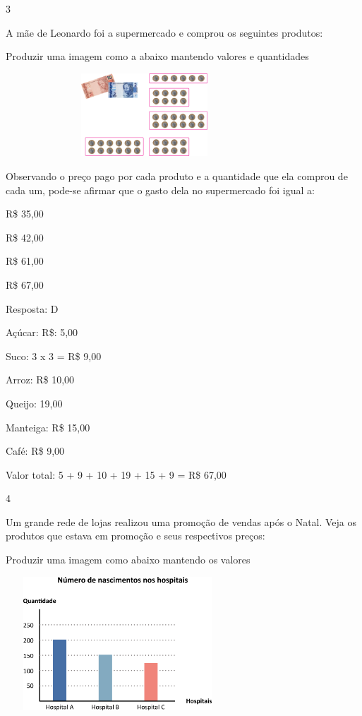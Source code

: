 \begin{escolha}
\num{3}

A mãe de Leonardo foi a supermercado e comprou os seguintes produtos:

Produzir uma imagem como a abaixo mantendo valores e quantidades

\includegraphics[width=4.10036in,height=1.22511in]{media/image74.png}

Observando o preço pago por cada produto e a quantidade que ela comprou
de cada um, pode-se afirmar que o gasto dela no supermercado foi igual
a:

\begin{escolha}

\item
  R\$ 35,00
\item
  R\$ 42,00
\item
  R\$ 61,00
\item
  R\$ 67,00
\end{escolha}

Resposta: D

Açúcar: R\$: 5,00

Suco: 3 x 3 = R\$ 9,00

Arroz: R\$ 10,00

Queijo: 19,00

Manteiga: R\$ 15,00

Café: R\$ 9,00

Valor total: 5 + 9 + 10 + 19 + 15 + 9 = R\$ 67,00

\num{4}

Um grande rede de lojas realizou uma promoção de vendas após o Natal.
Veja os produtos que estava em promoção e seus respectivos preços:

Produzir uma imagem como abaixo mantendo os valores

\includegraphics[width=3.30029in,height=1.97517in]{media/image75.png}


\end{escolha}
